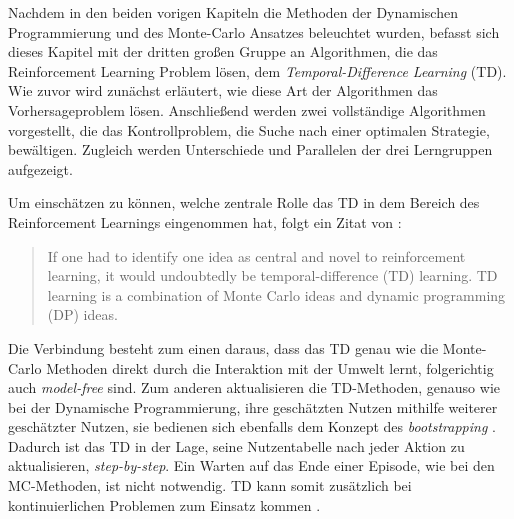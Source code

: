
Nachdem in den beiden vorigen Kapiteln die Methoden der Dynamischen Programmierung und des Monte-Carlo Ansatzes beleuchtet wurden, befasst sich dieses Kapitel mit der dritten großen Gruppe an Algorithmen, die das Reinforcement Learning Problem lösen, dem \textit{Temporal-Difference Learning} (TD).
Wie zuvor wird zunächst erläutert, wie diese Art der Algorithmen das Vorhersageproblem lösen. Anschließend werden zwei vollständige Algorithmen vorgestellt, die das Kontrollproblem, die Suche nach einer optimalen Strategie, bewältigen. Zugleich werden Unterschiede und Parallelen der drei Lerngruppen aufgezeigt.
\par 
Um einschätzen zu können, welche zentrale Rolle das TD in dem Bereich des Reinforcement Learnings eingenommen hat, folgt ein Zitat von \cite{Sutton1998}:
\begin{quote}
    If one had to identify one idea as central and novel to reinforcement learning, it would undoubtedly be temporal-difference (TD) learning. TD learning is a combination of Monte Carlo ideas and dynamic programming (DP) ideas. \cite[S.~119]{Sutton1998}
\end{quote}

Die Verbindung besteht zum einen daraus, dass das TD genau wie die Monte-Carlo Methoden direkt durch die Interaktion mit der Umwelt lernt, folgerichtig auch \textit{model-free} sind. Zum anderen aktualisieren die TD-Methoden, genauso wie bei der Dynamische Programmierung, ihre geschätzten Nutzen mithilfe weiterer geschätzter Nutzen, sie bedienen sich ebenfalls dem Konzept des \textit{bootstrapping} \cite[S.~119]{Sutton1998}. Dadurch ist das TD in der Lage, seine Nutzentabelle nach jeder Aktion zu aktualisieren, \textit{step-by-step}. Ein Warten auf das Ende einer Episode, wie bei den MC-Methoden, ist nicht notwendig. TD kann somit zusätzlich bei kontinuierlichen Problemen zum Einsatz kommen \cite[S.~124]{Sutton1998}.
\par 

